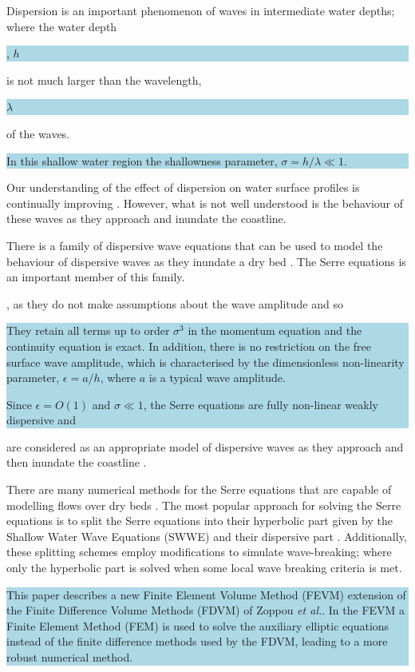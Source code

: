 \documentclass[times]{elsarticle}
\newcommand{\hlb}[1] {\par\colorbox{lightblue}{\parbox{\linewidth}{#1}}}
\newcommand{\hlr}[1] {\par\colorbox{lightred}{\parbox{\linewidth}{#1}}}
\newcommand{\hlb}[1] {{#1}}
\newcommand{\hlr}[1] {{}}
\begin{document}
Dispersion is an important phenomenon of waves in intermediate water depths; where the water depth\hlb{, $h$} is not much larger than the wavelength,  \hlb{$\lambda$} of the waves. \hlb{In this shallow water region the shallowness parameter, $\sigma = h/\lambda \ll 1$.} Our understanding of the effect of dispersion on water surface profiles is continually improving \cite{Pitt-2018-61}. However, what is not well understood is the behaviour of these waves as they approach and inundate the coastline. 


There is a family of dispersive wave equations that can be used to model the behaviour of dispersive waves as they inundate a dry bed \cite{Bonneton-Lannes-2009-16601}.  The Serre equations \cite{Serre-F-1953-857} is an important member of this family. \hlr{, as they do not make assumptions about the wave amplitude and so} \hlb{They  retain all terms up to order $\sigma^3$ in the momentum equation and the continuity equation is exact. In addition, there is no restriction on the free surface wave amplitude, which is characterised by the dimensionless non-linearity parameter, $\epsilon = a/h$, where $a$ is a typical wave amplitude.

Since $\epsilon = O(1)$ and $\sigma \ll 1$, the Serre equations are fully non-linear weakly dispersive and} are considered as an appropriate model of dispersive waves as they approach and then inundate the coastline \cite{Bonneton-Lannes-2009-16601}.

There are many numerical methods for the Serre equations that are capable of modelling flows over dry beds \cite{Tissier-2011,Li-2014-169,Filippini-etal-2016-381,DoCarmo-2019-125}. The most popular approach for solving the Serre equations is to split the Serre equations into their hyperbolic part given by the Shallow Water Wave Equations (SWWE) and their dispersive part \cite{Tissier-2011,Filippini-etal-2016-381,DoCarmo-2019-125}. Additionally, these splitting schemes employ modifications to simulate wave-breaking; where only the hyperbolic part is solved when some local wave breaking criteria is met.

\hlb{This paper describes a new Finite Element Volume Method (FEVM) extension of the Finite Difference Volume Methods (FDVM) of Zoppou \emph{et al.}\cite{Zoppou-etal-2017}. In the FEVM a Finite Element Method (FEM) is used to solve the auxiliary elliptic equations instead of the finite difference methods used by the FDVM, leading to a more robust numerical method.}
\end{document}
